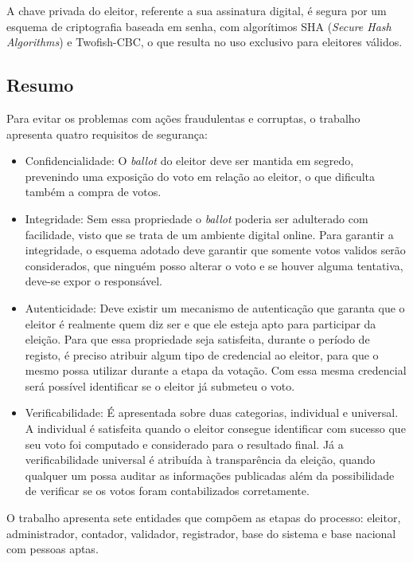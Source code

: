 \documentclass[letterpaper, 12 pt, conference]{ieeeconf}
\begin{document}
        A chave privada do eleitor, referente a sua assinatura digital, é segura por um esquema de criptografia baseada em senha, com algorítimos SHA (\textit{Secure Hash Algorithms}) e Twofish-CBC, o que resulta no uso exclusivo para eleitores válidos.
    \subsection{Resumo}
        Para evitar os problemas com ações fraudulentas e corruptas, o trabalho apresenta quatro requisitos de segurança:
        \begin{itemize}
            \item Confidencialidade: O \textit{ballot} do eleitor deve ser mantida em segredo, prevenindo uma exposição do voto em relação ao eleitor, o que dificulta também a compra de votos.
            
            \item Integridade: Sem essa propriedade o \textit{ballot} poderia ser adulterado com facilidade, visto que se trata de um ambiente digital online. Para garantir a integridade, o esquema adotado deve garantir que somente votos validos serão considerados, que ninguém posso alterar o voto e se houver alguma tentativa, deve-se expor o responsável.
            
            \item Autenticidade: Deve existir um mecanismo de autenticação que garanta que o eleitor é realmente quem diz ser e que ele esteja apto para participar da eleição. Para que essa propriedade seja satisfeita, durante o período de registo, é preciso atribuir algum tipo de credencial ao eleitor, para que o mesmo possa utilizar durante a etapa da votação. Com essa mesma credencial será possível identificar se o eleitor já submeteu o voto.
            
            \item Verificabilidade: É apresentada sobre duas categorias, individual e universal. A individual é satisfeita quando o eleitor consegue identificar com sucesso que seu voto foi computado e considerado para o resultado final. Já a verificabilidade universal é atribuída à transparência da eleição, quando qualquer um possa auditar as informações publicadas além da possibilidade de verificar se os votos foram contabilizados corretamente.
        \end{itemize}
        
        O trabalho apresenta sete entidades que compõem as etapas do processo: eleitor, administrador, contador, validador, registrador, base do sistema e base nacional com pessoas aptas.
        
\end{document}
